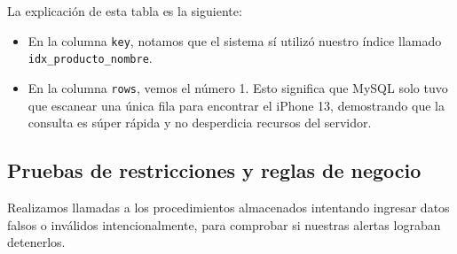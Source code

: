 \documentclass[10pt,letterpaper]{article}
\begin{document}
La explicaci\'on de esta tabla es la siguiente:
\begin{itemize}
    \item En la columna \texttt{key}, notamos que el sistema s\'i utiliz\'o nuestro \'indice llamado \texttt{idx\_producto\_nombre}.
    \item En la columna \texttt{rows}, vemos el n\'umero 1. Esto significa que MySQL solo tuvo que escanear una \'unica fila para encontrar el iPhone 13, demostrando que la consulta es s\'uper r\'apida y no desperdicia recursos del servidor.
\end{itemize}


\subsection{Pruebas de restricciones y reglas de negocio}
Realizamos llamadas a los procedimientos almacenados intentando ingresar datos falsos o inv\'alidos intencionalmente, para comprobar si nuestras alertas lograban detenerlos.
\end{document}
